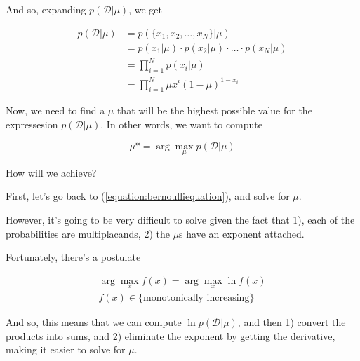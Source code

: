 \documentclass{tufte-handout}
\begin{document}
And so, expanding $p(\mathcal{D}|\mu)$, we get

\begin{equation} \label{equation:bernoulliequation}
  \begin{aligned}
    p(\mathcal{D}|\mu) &= p(\{x_1, x_2, \dots, x_N\}|\mu) \\
                       &= p(x_1|\mu) \cdot p(x_2|\mu) \cdot \ldots \cdot p(x_N|\mu) \\
                       &= \prod_{i = 1}^N p(x_i|\mu) \\
                       &= \prod_{i = 1}^N \mu x^i(1 - \mu)^{1 - x_i}
  \end{aligned}
\end{equation}

Now, we need to find a $\mu$ that will be the highest possible value for the
expressesion $p(\mathcal{D}|\mu)$. In other words, we want to compute

\begin{equation}
  \mu* = \arg \max\limits_{\mu}p(\mathcal{D}|\mu)
\end{equation}

How will we achieve?

First, let's go back to (\ref{equation:bernoulliequation}), and solve for $\mu$.

However, it's going to be very difficult to solve given the fact that 1), each
of the probabilities are multiplacands, 2) the $\mu$s have an exponent attached.

Fortunately, there's a postulate

\begin{equation} \label{equation:lnidentity}
  \begin{aligned}
    \arg \max\limits_x f(x) = \arg\max\limits_x \ln f(x) \\
    f(x) \in \{\text{monotonically increasing}\}
  \end{aligned}
\end{equation}

And so, this means that we can compute $\ln p(\mathcal{D}|\mu)$, and then 1)
convert the products into sums, and 2) eliminate the exponent by getting the
derivative, making it easier to solve for $\mu$.
\end{document}
